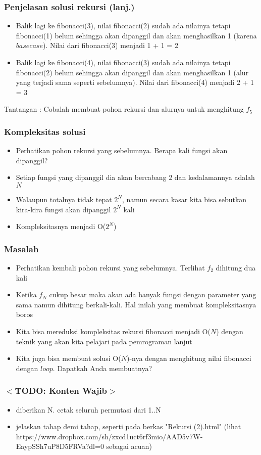 \documentclass{beamer}
\begin{document}
\begin{frame}
\frametitle{Penjelasan solusi rekursi (lanj.)}
\begin {itemize}
    \item Balik lagi ke fibonacci(3), nilai fibonacci(2) sudah ada nilainya tetapi fibonacci(1) belum sehingga akan dipanggil dan akan menghasilkan 1 (karena $base case$). Nilai dari fibonacci(3) menjadi 1 + 1 = 2
    \item Balik lagi ke fibonacci(4), nilai fibonacci(3) sudah ada nilainya tetapi fibonacci(2) belum sehingga akan dipanggil dan akan menghasilkan 1 (alur yang terjadi sama seperti sebelumnya). Nilai dari fibonacci(4) menjadi 2 + 1 = 3
\end{itemize}
Tantangan : Cobalah membuat pohon rekursi dan alurnya untuk menghitung $f_5$
\end{frame}

\begin{frame}
\frametitle{Kompleksitas solusi}
\begin {itemize}
   \item Perhatikan pohon rekursi yang sebelumnya. Berapa kali fungsi akan dipanggil?
   \item Setiap fungsi yang dipanggil dia akan bercabang 2 dan kedalamannya adalah $N$
   \item Walaupun totalnya tidak tepat $2^{N}$, namun secara kasar kita bisa sebutkan kira-kira fungsi akan dipanggil $2^{N}$ kali
   \item Kompleksitasnya menjadi O($2^{N}$)
\end {itemize}
\end{frame}

\begin{frame}
\frametitle{Masalah}
\begin{itemize}
    \item Perhatikan kembali pohon rekursi yang sebelumnya. Terlihat $f_2$ dihitung dua kali
    \item Ketika $f_N$ cukup besar maka akan ada banyak fungsi dengan parameter yang sama namun dihitung berkali-kali. Hal inilah yang membuat kompleksitasnya boros
    \item Kita bisa mereduksi kompleksitas rekursi fibonacci menjadi O($N$) dengan teknik yang akan kita pelajari pada pemrograman lanjut
    \item Kita juga bisa membuat solusi O($N$)-nya dengan menghitung nilai fibonacci dengan $loop$. Dapatkah Anda membuatnya?
\end{itemize}
\end{frame}

\begin{frame}
\frametitle{$<$TODO: Konten Wajib$>$}
\begin{itemize}
    \item diberikan N. cetak seluruh permutasi dari 1..N
    \item jelaskan tahap demi tahap, seperti pada berkas "Rekursi (2).html" (lihat  https://www.dropbox.com/sh/zxcd1uct6rf3mio/AAD5v7W-EaypSSh7uP8D5FRVa?dl=0 sebagai acuan)
\end{itemize}
\end{frame}
\end{document}
